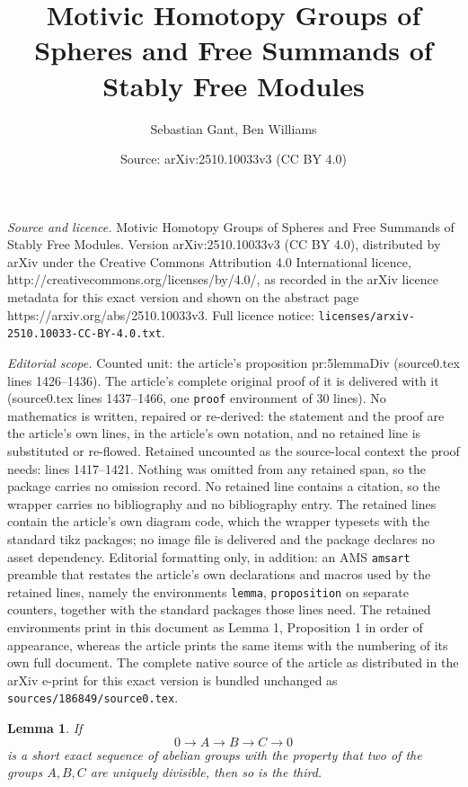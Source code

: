 \documentclass[10pt,a4paper]{amsart}
\title{Motivic Homotopy Groups of Spheres and Free Summands of Stably Free Modules}
\author{Sebastian Gant, Ben Williams}
\date{Source: arXiv:2510.10033v3 (CC BY 4.0)}
\newtheorem{lemma}{Lemma}
\begin{document}
\maketitle

\noindent\emph{Source and licence.} Motivic Homotopy Groups of Spheres and Free Summands of Stably Free Modules. Version arXiv:2510.10033v3 (CC BY 4.0), distributed by arXiv under the Creative Commons Attribution 4.0 International licence, http://creativecommons.org/licenses/by/4.0/, as recorded in the arXiv licence metadata for this exact version and shown on the abstract page https://arxiv.org/abs/2510.10033v3. Full licence notice: \texttt{licenses/arxiv-2510.10033-CC-BY-4.0.txt}.\par\smallskip

\noindent\textit{Editorial scope.} Counted unit: the article's proposition pr:5lemmaDiv (source0.tex lines 1426--1436). The article's complete original proof of it is delivered with it (source0.tex lines 1437--1466, one \texttt{proof} environment of 30 lines). No mathematics is written, repaired or re-derived: the statement and the proof are the article's own lines, in the article's own notation, and no retained line is substituted or re-flowed.  Retained uncounted as the source-local context the proof needs: lines 1417--1421.  Nothing was omitted from any retained span, so the package carries no omission record.  No retained line contains a citation, so the wrapper carries no bibliography and no bibliography entry.  The retained lines contain the article's own diagram code, which the wrapper typesets with the standard tikz packages; no image file is delivered and the package declares no asset dependency.  Editorial formatting only, in addition: an AMS \texttt{amsart} preamble that restates the article's own declarations and macros used by the retained lines, namely the environments \texttt{lemma}, \texttt{proposition} on separate counters, together with the standard packages those lines need.  The retained environments print in this document as Lemma 1, Proposition 1 in order of appearance, whereas the article prints the same items with the numbering of its own full document.  The complete native source of the article as distributed in the arXiv e-print for this exact version is bundled unchanged as \texttt{sources/186849/source0.tex}.
\begin{lemma} \label{lem:2of3divisibility}
  If
  \[ 0 \to A \to B \to C \to 0 \]
  is a short exact sequence of abelian groups with the property that two of the groups $A,B,C$ are uniquely divisible, then so is the third.
\end{lemma}
\end{document}

